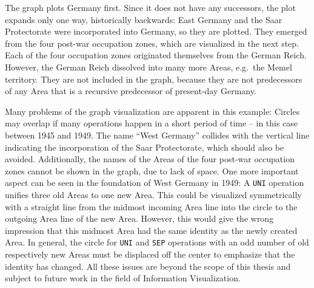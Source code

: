 The graph plots Germany first. Since it does not have any successors, the plot expands only one way, historically backwards: East Germany and the Saar Protectorate were incorporated into Germany, so they are plotted. They emerged from the four post-war occupation zones, which are visualized in the next step. Each of the four occupation zones originated themselves from the German Reich. However, the German Reich dissolved into many more Areas, e.g.\ the Memel territory. They are not included in the graph, because they are not predecessors of any Area that is a recursive predecessor of present-day Germany.

Many problems of the graph visualization are apparent in this example: Circles may overlap if many operations happen in a short period of time -- in this case between 1945 and 1949.
The name ``West Germany'' collides with the vertical line indicating the incorporation of the Saar Protectorate, which should also be avoided.
Additionally, the names of the Areas of the four post-war occupation zones cannot be shown in the graph, due to lack of space.
One more important aspect can be seen in the foundation of West Germany in 1949: A \texttt{UNI} operation unifies three old Areas to one new Area. This could be visualized symmetrically with a straight line from the midmost incoming Area line into the circle to the outgoing Area line of the new Area. However, this would give the wrong impression that this midmost Area had the same identity as the newly created Area. In general, the circle for \texttt{UNI} and \texttt{SEP} operations with an odd number of old respectively new Areas must be displaced off the center to emphasize that the identity has changed.
All these issues are beyond the scope of this thesis and subject to future work in the field of Information Visualization.


